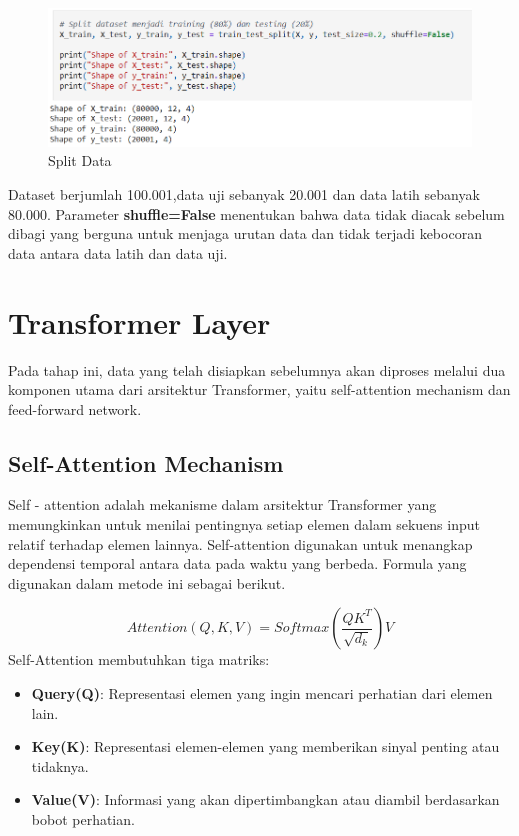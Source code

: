 \begin{figure} [H] \centering
  \includegraphics[scale=1.0]{gambar/splitdata.png} 
  \caption{Split Data}
  \label{fig:split_data}
\end{figure}

Dataset berjumlah 100.001,data uji sebanyak 20.001 dan data latih sebanyak 80.000. Parameter \textbf{shuffle=False} menentukan bahwa data tidak diacak sebelum dibagi yang berguna untuk menjaga urutan data dan tidak terjadi kebocoran data antara data latih dan data uji.

\section{Transformer Layer}
Pada tahap ini, data yang telah disiapkan sebelumnya akan diproses melalui dua komponen utama dari arsitektur Transformer, yaitu self-attention mechanism dan feed-forward network.

\subsection{Self-Attention Mechanism}
Self - attention adalah mekanisme dalam arsitektur Transformer yang memungkinkan untuk menilai pentingnya setiap elemen dalam sekuens input relatif terhadap elemen lainnya. Self-attention digunakan untuk menangkap dependensi temporal antara data pada waktu yang berbeda. Formula yang digunakan dalam metode ini sebagai berikut.

\begin{equation}
  Attention(Q,K,V) = Softmax(\frac{QK^{T}}{\sqrt{d_{k}}})V
\end{equation}
Self-Attention membutuhkan tiga matriks:
\begin{itemize}
  \item \textbf{Query(Q)}: Representasi elemen yang ingin mencari perhatian dari elemen lain.
  \item \textbf{Key(K)}: Representasi elemen-elemen yang memberikan sinyal penting atau tidaknya.
  \item \textbf{Value(V)}: Informasi yang akan dipertimbangkan atau diambil berdasarkan bobot perhatian.
\end{itemize}

